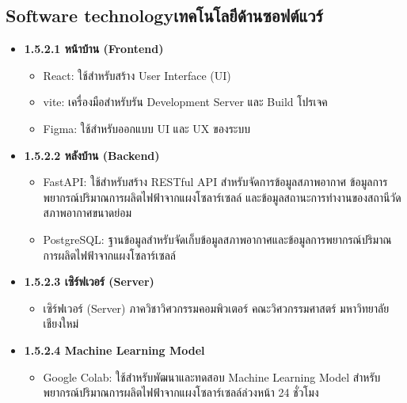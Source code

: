 \subsection{\ifenglish Software technology\else เทคโนโลยีด้านซอฟต์แวร์\fi}
\begin{itemize}
\item[] \textbf{1.5.2.1 หน้าบ้าน (Frontend) }
    \begin{itemize}
        \item React: ใช้สำหรับสร้าง User Interface (UI)
        \item vite: เครื่องมือสำหรับรัน Development Server และ Build โปรเจค
        \item Figma: ใช้สำหรับออกแบบ UI และ UX ของระบบ
    \end{itemize}
\end{itemize}
\begin{itemize}
\item[] \textbf{1.5.2.2 หลังบ้าน (Backend) }
    \begin{itemize}
        \item FastAPI: ใช้สำหรับสร้าง RESTful API สำหรับจัดการข้อมูลสภาพอากาศ ข้อมูลการพยากรณ์ปริมาณการผลิตไฟฟ้าจากแผงโซลาร์เซลล์ และข้อมูลสถานะการทำงานของสถานีวัดสภาพอากาศขนาดย่อม
        \item PostgreSQL: ฐานข้อมูลสำหรับจัดเก็บข้อมูลสภาพอากาศและข้อมูลการพยากรณ์ปริมาณการผลิตไฟฟ้าจากแผงโซลาร์เซลล์
    \end{itemize}
\end{itemize}
\begin{itemize}
\item[] \textbf{1.5.2.3 เซิร์ฟเวอร์ (Server)  }
    \begin{itemize}
        \item เซิร์ฟเวอร์ (Server) ภาควิชาวิศวกรรมคอมพิวเตอร์ คณะวิศวกรรมศาสตร์ มหาวิทยาลัยเชียงใหม่ 
    \end{itemize}
\end{itemize}
\begin{itemize}
\item[] \textbf{1.5.2.4 Machine Learning Model }
    \begin{itemize}
        \item  Google Colab: ใช้สำหรับพัฒนาและทดสอบ Machine Learning Model สำหรับพยากรณ์ปริมาณการผลิตไฟฟ้าจากแผงโซลาร์เซลล์ล่วงหน้า 24 ชั่วโมง
    \end{itemize}
\end{itemize}





